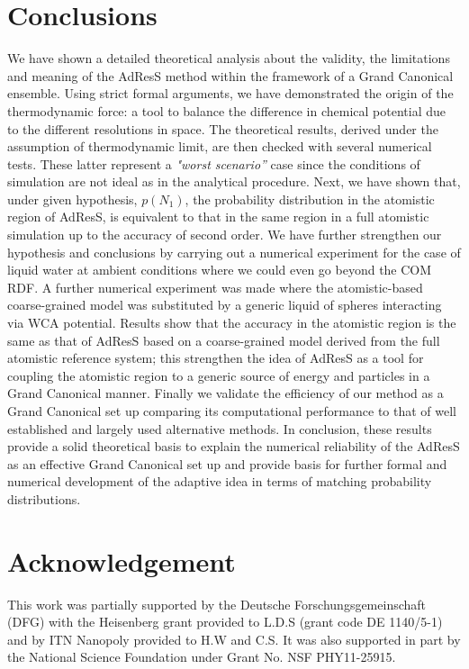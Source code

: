 \documentclass[aip,jcp,a4paper,reprint,onecolumn]{revtex4-1}
\newcommand{\redc}[1]{{\color{red} #1}}
\begin{document}
\section{Conclusions}
We have shown a detailed theoretical analysis about the validity, the limitations and meaning of the AdResS method within the framework of a Grand Canonical ensemble.
Using strict formal arguments, we have demonstrated the origin of the thermodynamic force: a tool to balance the difference in chemical potential due to the different resolutions in space.
  The theoretical results, derived under the assumption of thermodynamic limit, are then checked with several numerical tests. These latter represent a {\it "worst scenario''} case since the conditions of simulation are not ideal as in the analytical procedure.
\redc{Next}, we have shown that, under given hypothesis, $p(N_{1})$, the probability distribution in the atomistic region of AdResS, is equivalent to that in the same region in a full atomistic simulation up to the accuracy of second order. We have further strengthen our hypothesis and conclusions by carrying out a numerical experiment for the case of liquid water at ambient conditions where we could even go beyond the COM RDF. 
A further numerical experiment was made where the atomistic-based coarse-grained model was substituted by a generic liquid of spheres interacting via WCA potential. Results show that the accuracy in the atomistic region is the same as that of AdResS based on a coarse-grained model derived from the full atomistic reference system; this strengthen the idea of AdResS as a tool for coupling the atomistic region to a generic source of energy and particles in a Grand Canonical manner. \redc{Finally we validate the efficiency of our method as a Grand Canonical set up comparing its computational performance to that of well established and largely used alternative methods.} 
In conclusion, these results provide a solid theoretical basis to explain the numerical reliability of the AdResS as an effective Grand Canonical set up and provide basis for further formal and numerical development of the adaptive idea in terms of matching probability distributions.


\section*{Acknowledgement}
This work was partially supported by the Deutsche Forschungsgemeinschaft (DFG) with the Heisenberg grant provided to L.D.S (grant code DE 1140/5-1) and by ITN Nanopoly provided to H.W and C.S.
It was also supported in part by the National Science Foundation under Grant No. NSF PHY11-25915.
\end{document}
